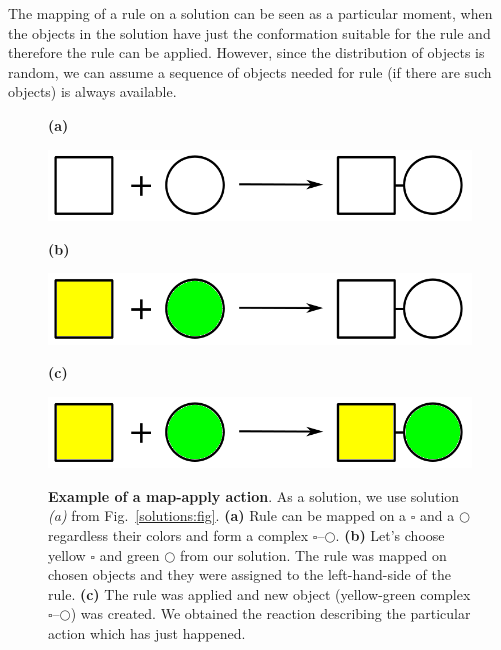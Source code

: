 \documentclass[12pt]{fithesis2}
\begin{document}
The mapping of a rule on a solution can be seen as a particular moment, when the objects in the solution have just the conformation suitable for the rule and therefore the rule can be applied. However, since the distribution of objects is random, we can assume a sequence of objects needed for rule (if there are such objects) is always available.

\begin{figure}[!h]
\begin{center}
\begin{minipage}[l]{0.1\textwidth}
    \textbf{(a)}
  \end{minipage}
  \begin{minipage}[r]{0.6\textwidth}
    {\hspace*{1.3cm}\includegraphics[scale=0.2]{pics/rule_complex}}
\end{minipage}

\begin{minipage}[l]{0.1\textwidth}
    \textbf{(b)}
  \end{minipage}
  \begin{minipage}[r]{0.6\textwidth}
    {\hspace*{1.3cm}\includegraphics[scale=0.2]{pics/rule_complex_mapped}}
\end{minipage}

\begin{minipage}[l]{0.1\textwidth}
    \textbf{(c)}
  \end{minipage}
  \begin{minipage}[r]{0.6\textwidth}
    {\hspace*{1.3cm}\includegraphics[scale=0.2]{pics/rule_reaction}}
\end{minipage}
\caption{\textbf{Example of a map-apply action}. As a solution, we use solution \textit{(a)} from Fig.~\ref{solutions:fig}. \textbf{(a)} Rule can be mapped on a $\square$ and a $\bigcirc$ regardless their colors and form a complex $\square$--$\bigcirc$.  \textbf{(b)} Let's choose yellow $\square$ and green $\bigcirc$ from our solution. The rule was mapped on chosen objects and they were assigned to the left-hand-side of the rule. \textbf{(c)} The rule was applied and new object (yellow-green complex $\square$--$\bigcirc$) was created. We obtained the reaction describing the particular action which has just happened.}
\label{map-apply:fig}
\end{center}
\end{figure}
\end{document}
